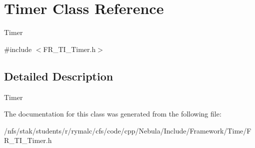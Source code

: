 \hypertarget{classTimer}{
\section{Timer Class Reference}
\label{classTimer}
}


Timer  


{\ttfamily \#include $<$FR\_\-TI\_\-Timer.h$>$}

\subsection{Detailed Description}
Timer 

The documentation for this class was generated from the following file:\begin{DoxyCompactItemize}
\item 
/nfs/stak/students/r/rymalc/cfs/code/cpp/Nebula/Include/Framework/Time/FR\_\-TI\_\-Timer.h\end{DoxyCompactItemize}
